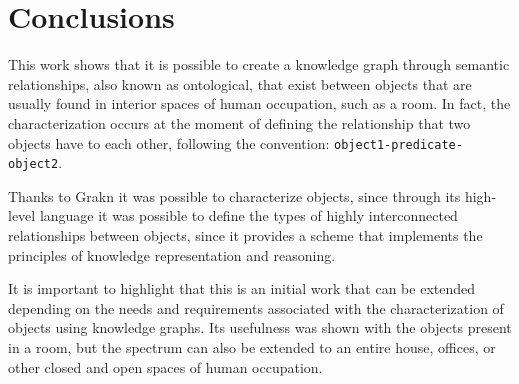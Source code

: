 \section{Conclusions}
This work shows that it is possible to create a knowledge graph through semantic relationships, also known as ontological, that exist between objects that are usually found in interior spaces of human occupation, such as a room. In fact, the characterization occurs at the moment of defining the relationship that two objects have to each other, following the convention: \texttt{object1-predicate-object2}.

Thanks to Grakn it was possible to characterize objects, since through its high-level language it was possible to define the types of highly interconnected relationships between objects, since it provides a scheme that implements the principles of knowledge representation and reasoning.

It is important to highlight that this is an initial work that can be extended depending on the needs and requirements associated with the characterization of objects using knowledge graphs. Its usefulness was shown with the objects present in a room, but the spectrum can also be extended to an entire house, offices, or other closed and open spaces of human occupation.

